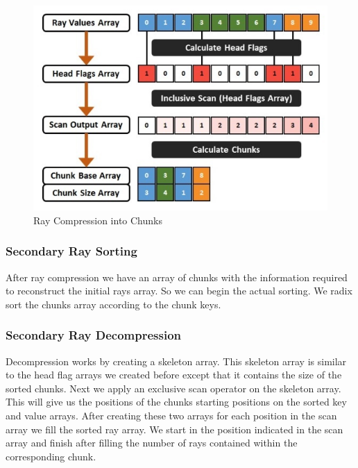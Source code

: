\documentclass{egpubl}
\begin{document}
\begin{figure}[!htb]
    \centering
    \includegraphics[scale=0.50]{images/ray-compression.jpg}
    \caption{\label{fig:rcc}Ray Compression into Chunks}
\end{figure}

\subsubsection{Secondary Ray Sorting}

After ray compression we have an array of chunks with the information required to reconstruct the initial rays array. So we can begin the actual sorting. We radix sort \cite{Merrill11} the chunks array according to the chunk keys.

\subsubsection{Secondary Ray Decompression}

Decompression works by creating a skeleton array. This skeleton array is similar to the head flag arrays we created before except that it contains the size of the sorted chunks. Next we apply an exclusive scan operator on the skeleton array. This will give us the positions of the chunks starting positions on the sorted key and value arrays. After creating these two arrays for each position in the scan array we fill the sorted ray array. We start in the position indicated in the scan array and finish after filling the number of rays contained within the corresponding chunk.
\end{document}
